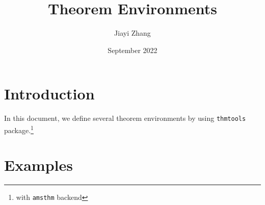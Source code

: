 \documentclass{article}
\title{Theorem Environments}
\author{Jiayi Zhang}
\date{September 2022}
\begin{document}
\maketitle

\section{Introduction}
In this document, we define several theorem environments by using 
\texttt{thmtools} package.\footnote{with \texttt{amsthm} backend}

\section{Examples}

\begin{theorem}
	\lipsum[1][1-3]
\end{theorem}

\begin{lemma}
	\lipsum[1][4-5]
\end{lemma}

\begin{proposition}
	\lipsum[1][6-7]
\end{proposition}

\begin{definition}
	\lipsum[2][1-3]
\end{definition}

\begin{remark}
	\lipsum[3]
\end{remark}

\begin{example}
	\lipsum[4]
\end{example}

\begin{Proof}
	\lipsum[5]
\end{Proof}
\end{document}
